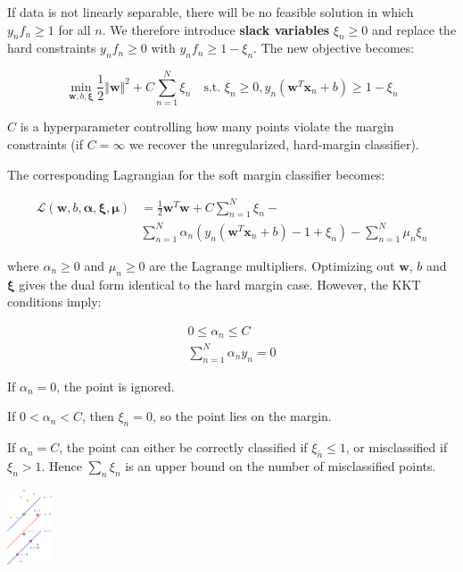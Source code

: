 \documentclass[10pt,landscape]{article}
\begin{document}
\begin{multicols}{3}
If data is not linearly separable, there will be no feasible solution in which $y_n f_n \geq 1$ for all $n$. We therefore introduce \textbf{slack variables} $\xi_n \geq 0$ and replace the hard constraints $y_n f_n \geq 0$ with $y_n f_n \geq 1 - \xi_n$. The new objective becomes:

\begin{equation*}
\boxed{\min_{\mathbf{w}, b, \mathbf{\xi}}\frac{1}{2}\Vert \mathbf{w} \Vert^2 + C\sum_{n=1}^{N} \xi_n \quad \textrm{s.t. } \xi_n \geq 0, y_n\left( \mathbf{w}^{T}\mathbf{x}_n + b \right) \geq 1 - \xi_n}
\end{equation*}

$C$ is a hyperparameter controlling how many points violate the margin constraints (if $C = \infty$ we recover the unregularized, hard-margin classifier).

The corresponding Lagrangian for the soft margin classifier becomes:

\begin{align*}
\mathcal{L}\left( \mathbf{w}, b, \mathbf{\alpha}, \mathbf{\xi}, \mathbf{\mu} \right) & = \frac{1}{2}\mathbf{w}^T\mathbf{w} + C\sum_{n=1}^N \xi_n - \\
& \sum_{n=1}^N \alpha_n \left( y_n \left( \mathbf{w}^{T}\mathbf{x}_n + b \right) - 1 + \xi_n \right) - \sum_{n=1}^{N} \mu_n \xi_n
\end{align*}

where $\alpha_n \geq 0$ and $\mu_n \geq 0$ are the Lagrange multipliers. Optimizing out $\mathbf{w}$, $b$ and $\mathbf{\xi}$ gives the dual form identical to the hard margin case. However, the KKT conditions imply:

\begin{align*}
0 \leq \alpha_n \leq C \\
\sum_{n=1}^{N} \alpha_n y_n = 0
\end{align*}

If $\alpha_n = 0$, the point is ignored.

If $0 < \alpha_n < C$, then $\xi_n = 0$, so the point lies on the margin.

If $\alpha_n = C$, the point can either be correctly classified if $\xi_n \leq 1$, or misclassified if $\xi_n > 1$. Hence $\sum_n \xi_n$ is an upper bound on the number of misclassified points.

\begin{center}
\includegraphics[width=0.1\textwidth]{Figure_17.13_B.png}
\end{center}


\end{multicols}
\end{document}
